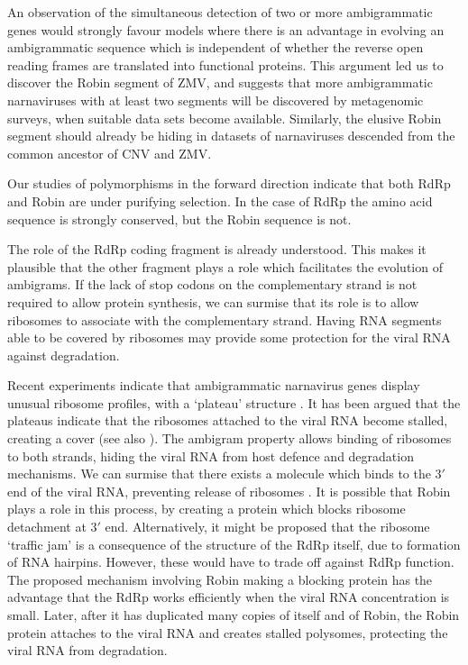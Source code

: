 \documentclass[unnumsec,webpdf,contemporary,large,namedate]{oup-authoring-template}%
\theoremstyle{thmstyleone}%
\theoremstyle{thmstyletwo}%
\theoremstyle{thmstylethree}%
\begin{document}
An observation of the simultaneous detection of two or more ambigrammatic genes would
strongly favour models where there is an advantage in evolving an
ambigrammatic sequence which is independent of whether the reverse open reading
frames are translated into functional proteins. This argument led us to discover the Robin segment
of ZMV, and suggests that more ambigrammatic narnaviruses with at least two segments will be discovered
by metagenomic surveys, when suitable data sets become available.
Similarly, the elusive Robin segment should already be hiding in datasets of narnaviruses descended from the common ancestor of CNV and ZMV.


Our studies of polymorphisms in the forward direction indicate that both RdRp and Robin are under purifying selection.
In the case of RdRp the amino acid sequence is strongly conserved,
but the Robin sequence is not.

The role of the RdRp coding fragment
is already understood. This makes it plausible that the other fragment plays a role which facilitates the
evolution of ambigrams. If the lack of stop codons on the complementary strand is not required
to allow protein synthesis, we can surmise that its role is to allow ribosomes to associate with the
complementary strand. Having RNA segments able to be covered by ribosomes may provide some protection
for the viral RNA against degradation.

Recent experiments indicate that ambigrammatic narnavirus genes display unusual ribosome 
profiles, with a \lq plateau' structure \citep{Ret+20}. It has been argued \citep{Wil+21} that the plateaus
indicate that the ribosomes attached to the viral RNA become stalled, creating a cover (see also
\cite{Cep20}). The ambigram property allows binding of ribosomes to both strands, hiding the viral 
RNA from host defence and degradation mechanisms. We can surmise that there exists a molecule 
which binds to the $3'$ end of the viral RNA, preventing release of ribosomes \citep{Wil+21}. It is possible 
that Robin plays a role in this process, by creating a protein which blocks ribosome detachment at $3'$ end. 
Alternatively, it might be proposed that the ribosome \lq traffic jam' is a consequence of the structure of the
RdRp itself, due to formation of RNA hairpins. However, these would have to trade off against RdRp function.
The proposed mechanism involving Robin making a blocking protein
has the advantage that the RdRp works efficiently when the viral RNA concentration is small.
Later, after it has duplicated many copies of itself and of Robin, the Robin protein attaches
to the viral RNA and creates stalled polysomes, protecting the viral RNA from degradation.
\end{document}
